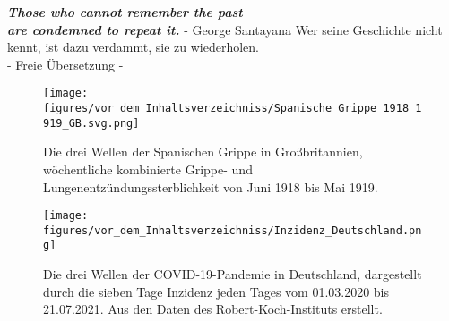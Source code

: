 \vspace*{10pt}
\begin{center}
    \huge{\textbf{
    \textit{Those who cannot remember the past\\ are condemned to repeat it.}}}
    \large{- George Santayana \autocite{history-quoteSantayana}}
    Wer seine Geschichte nicht kennt, ist dazu verdammt, sie zu wiederholen.\\
    - Freie Übersetzung -
\end{center}
\vspace*{40pt}
\begin{figure}[h]
    \centering
    \texttt{[image: figures/vor\_dem\_Inhaltsverzeichniss/Spanische\_Grippe\_1918\_1919\_GB.svg.png]}
    \caption{Die drei Wellen der \glqq{}Spanischen Grippe\grqq{} in Großbritannien, wöchentliche kombinierte Grippe- und Lungenentzündungssterblichkeit von Juni 1918 bis Mai 1919. \autocite{spanischflu}}
    \label{fig:spanishflu}
\end{figure}
\vspace*{11pt}
\begin{figure}[h]
    \centering
    \texttt{[image: figures/vor\_dem\_Inhaltsverzeichniss/Inzidenz\_Deutschland.png]}
    \caption{Die drei Wellen der COVID-19-Pandemie in Deutschland, dargestellt durch die sieben Tage Inzidenz jeden Tages vom 01.03.2020 bis 21.07.2021. Aus den Daten des Robert-Koch-Instituts erstellt.}
    \label{fig:germany_incidence}
\end{figure}